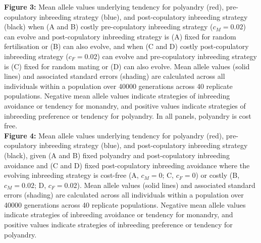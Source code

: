 \documentclass[12pt]{article}
\begin{document}
\noindent \textbf{Figure 3:} Mean allele values underlying tendency for polyandry (red), pre-copulatory inbreeding strategy (blue), and post-copulatory inbreeding strategy (black) when (A and B) costly pre-copulatory inbreeding strategy ($c_{M} = 0.02$) can evolve and post-copulatory inbreeding strategy is (A) fixed for random fertilisation or (B) can also evolve, and when (C and D) costly post-copulatory inbreeding strategy ($c_{F} = 0.02$) can evolve and pre-copulatory inbreeding strategy is (C) fixed for random mating or (D) can also evolve. Mean allele values (solid lines) and associated standard errors (shading) are calculated across all individuals within a population over 40000 generations across 40 replicate populations. Negative mean allele values indicate strategies of inbreeding avoidance or tendency for monandry, and positive values indicate strategies of inbreeding preference or tendency for polyandry. In all panels, polyandry is cost free. \\

\noindent \textbf{Figure 4:} Mean allele values underlying tendency for polyandry (red), pre-copulatory inbreeding strategy (blue), and post-copulatory inbreeding strategy (black), given (A and B) fixed polyandry and post-copulatory inbreeding avoidance and (C and D) fixed post-copulatory inbreeding avoidance where the evolving inbreeding strategy is cost-free (A, $c_{M} = 0$; C, $c_{F} = 0$) or costly (B, $c_{M}=0.02$; D, $c_{F}=0.02$). Mean allele values (solid lines) and associated standard errors (shading) are calculated across all individuals within a population over 40000 generations across 40 replicate populations. Negative mean allele values indicate strategies of inbreeding avoidance or tendency for monandry, and positive values indicate strategies of inbreeding preference or tendency for polyandry.
\end{document}
